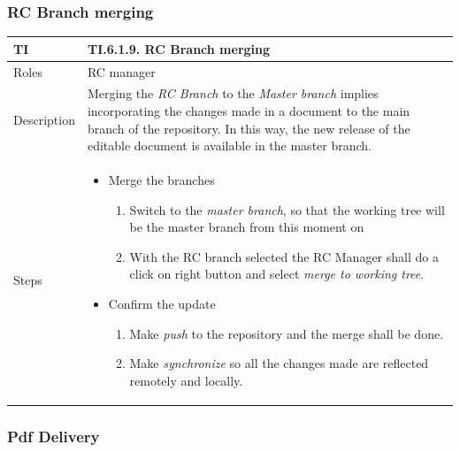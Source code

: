 \documentclass{template/openetcs_article}
\begin{document}
\subsubsection{RC Branch merging}

\begin{flushleft}
\tablefirsthead{}
\tablehead{}
\tabletail{}
\tablelasttail{}
\begin{supertabular}{|m{2cm}|m{13cm}|}
\hline
{}
TI & 
TI.6.1.9. RC Branch merging
\\\hline
Roles &
RC manager
\\\hline
Description &
Merging the {\it RC Branch} to the {\it Master branch} implies incorporating the changes made in a document to the main branch of the repository. In this way, the new release of the editable document is available in the master branch.
\\\hline
Steps &
\begin{itemize}
\item Merge the branches 
\begin{enumerate}
\item Switch to the {\it master branch}, so that the working tree will be the master branch from this moment on
\item With the RC branch selected the RC Manager shall do a click on right button and select {\it merge to working tree}.
\end{enumerate}
\item Confirm the update
\begin{enumerate}
\item Make {\it push} to the repository and the merge shall be done.
\item Make {\it synchronize} so all the changes made are reflected remotely and locally.
\end{enumerate}
\end{itemize}
\\\hline
\end{supertabular}
\end{flushleft}

\subsubsection{Pdf Delivery}
\end{document}
